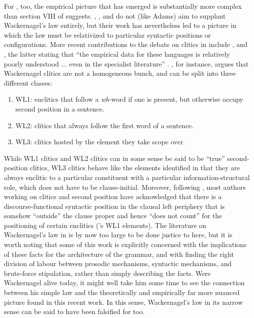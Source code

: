 For , too, the empirical picture that has emerged is substantially more complex than section VIII of \citet{Wackernagel1892} suggests. \citet{Hale1987PhD,Hale1987wackernagel,Hale1996}, \citet{Krisch1990}, and \citet{Hock1996} do not (like Adams) aim to supplant Wackernagel's law entirely, but their work has nevertheless led to a picture in which the law must be relativized to particular syntactic positions or configurations. More recent contributions to the debate on clitics in  include \citet{Keydana2011}, \citet{Lowe2014} and \citet{Hale2017}, the latter stating that ``the empirical data for these languages is relatively poorly understood ... even in the specialist literature'' \citeyearpar[290]{Hale2017}. \citet{Keydana2011}, for instance, argues that Wackernagel clitics are not a homogeneous bunch, and can be split into three different classes:

\begin{enumerate}
    \item WL1: enclitics that follow a \textit{wh}-word if one is present, but otherwise occupy second position in a sentence.
    \item WL2: clitics that always follow the first word of a sentence.
    \item WL3: clitics hosted by the element they take scope over.
\end{enumerate}

While WL1 clitics and WL2 clitics can in some sense be said to be ``true'' second-position clitics, WL3 clitics behave like the elements    \citet{Adams1994book,Adams1994pronouns} identified in that they are always enclitic to a particular constituent with a particular information-structural role, which does not have to be clause-initial. Moreover, following \citet{Hale1987PhD,Hale1987wackernagel}, most authors working on  clitics and second position have acknowledged that there is a discourse-functional syntactic position in the clausal left periphery that is somehow ``outside'' the clause proper and hence ``does not count'' for the positioning of certain enclitics (\citeauthor{Keydana2011}'s WL1 elements). The literature on Wackernagel's law in  is by now too large to be done justice to here, but it is worth noting that some of this work is explicitly concerned with the implications of these facts for the architecture of the grammar, and with finding the right division of labour between prosodic mechanisms, syntactic mechanisms, and brute-force stipulation, rather than simply describing the facts. Were Wackernagel alive today, it might well take him some time to see the connection between his simple law and the theoretically and empirically far more nuanced picture found in this recent work. In this sense, Wackernagel's law in its narrow sense can be said to have been falsified for  too.

